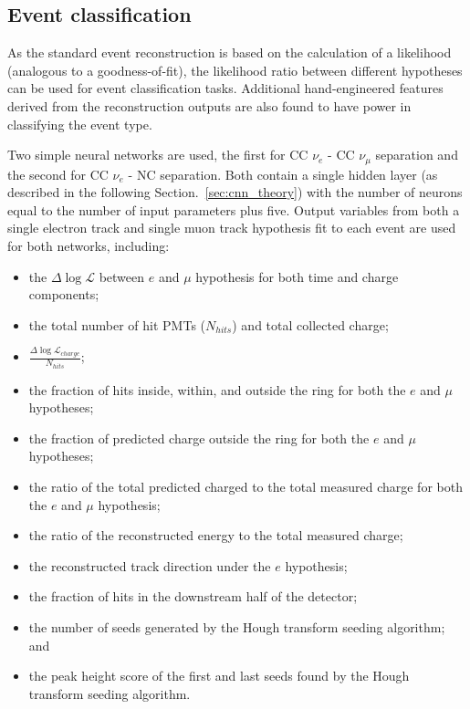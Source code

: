 \subsection{Event classification}%
\label{sec:cnn_old_pid} %

As the standard event reconstruction is based on the calculation of a likelihood (analogous to a
goodness-of-fit), the likelihood ratio between different hypotheses can be used for event
classification tasks. Additional hand-engineered features derived from the reconstruction outputs
are also found to have power in classifying the event type.

Two simple neural networks are used, the first for CC $\nu_{e}$ - CC $\nu_{\mu}$ separation and
the second for CC $\nu_{e}$ - NC separation. Both contain a single hidden layer (as described in
the following Section.~\ref{sec:cnn_theory}) with the number of neurons equal to the number of
input parameters plus five. Output variables from both a single electron track and single muon
track hypothesis fit to each event are used for both networks, including:
\begin{itemize}
    \item the $\Delta\log\mathcal{L}$ between $e$ and $\mu$ hypothesis for both time and charge
          components;
    \item the total number of hit PMTs ($N_{hits}$) and total collected charge;
    \item $\frac{\Delta\log\mathcal{L}_{charge}}{N_{hits}}$;
    \item the fraction of hits inside, within, and outside the ring for both the $e$ and $\mu$
          hypotheses;
    \item the fraction of predicted charge outside the ring for both the $e$ and $\mu$ hypotheses;
    \item the ratio of the total predicted charged to the total measured charge for both the $e$
          and $\mu$ hypothesis;
    \item the ratio of the reconstructed energy to the total measured charge;
    \item the reconstructed track direction under the $e$ hypothesis;
    \item the fraction of hits in the downstream half of the detector;
    \item the number of seeds generated by the Hough transform seeding algorithm; and
    \item the peak height score of the first and last seeds found by the Hough transform seeding
          algorithm.
\end{itemize}

